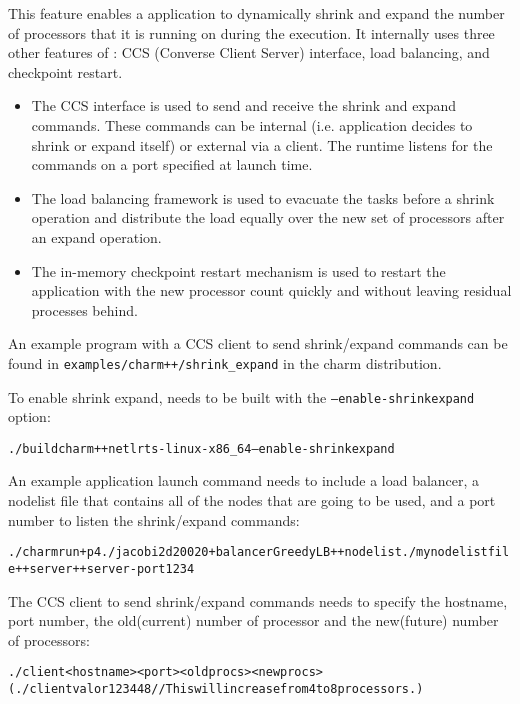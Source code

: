 \experimental{}
This feature enables a \charmpp{} application to dynamically shrink and expand
the number of processors that it is running on during the execution.
It internally uses three other features of \charmpp{}:
CCS (Converse Client Server) interface, load balancing, and checkpoint restart.
\begin{itemize}
\item The CCS interface is used to send and receive the shrink and expand commands.
These commands can be internal (i.e. application decides to shrink or expand
itself) or external via a client. The runtime listens for the commands on
a port specified at launch time.
\item The load balancing framework is used to evacuate the tasks before a shrink
operation and distribute the load equally over the new set of processors
after an expand operation.
\item The in-memory checkpoint restart mechanism is used to restart the application
with the new processor count quickly and without leaving residual processes behind.
\end{itemize}

An example program with a CCS client to send shrink/expand commands
can be found in \texttt{examples/charm++/shrink_expand}
in the charm distribution.

To enable shrink expand, \charmpp{} needs to be built with the \texttt{--enable-shrinkexpand}
option:
\begin{alltt}
	./build charm++ netlrts-linux-x86_64 --enable-shrinkexpand
\end{alltt}

An example application launch command needs to include a load balancer, a
nodelist file that contains all of the nodes that are going to be used, and a
port number to listen the shrink/expand commands:
\begin{alltt}
	./charmrun +p4 ./jacobi2d 200 20 +balancer GreedyLB ++nodelist ./mynodelistfile ++server ++server-port 1234
\end{alltt}

The CCS client to send shrink/expand commands needs to specify the hostname,
port number, the old(current) number of processor and the new(future) number of
processors:
\begin{alltt}
	./client <hostname> <port> <oldprocs> <newprocs>\\
	(./client valor 1234 4 8 //This will increase from 4 to 8 processors.)
\end{alltt}

